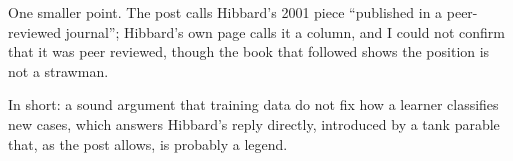 \begin{afterword}
One smaller point. The post calls Hibbard's 2001 piece ``published in a peer-reviewed journal''; Hibbard's own page calls it a column, and I could not confirm that it was peer reviewed, though the book that followed shows the position is not a strawman.

In short: a sound argument that training data do not fix how a learner classifies new cases, which answers Hibbard's reply directly, introduced by a tank parable that, as the post allows, is probably a legend.
\end{afterword}
